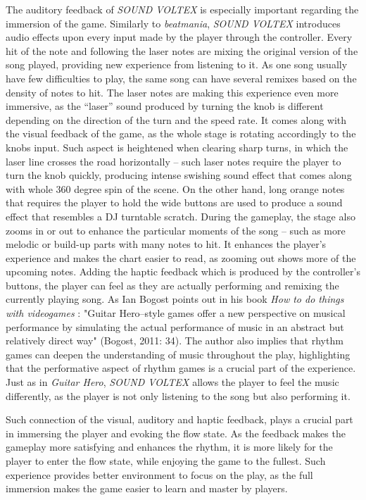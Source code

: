 The auditory feedback of \textit{SOUND VOLTEX} is especially important regarding the immersion of the game. Similarly to \textit{beatmania}, \textit{SOUND VOLTEX} introduces audio effects upon every input made by the player through the controller. Every hit of the note and following the laser notes are mixing the original version of the song played, providing new experience from listening to it. As one song usually have few difficulties to play, the same song can have several remixes based on the density of notes to hit. The laser notes are making this experience even more immersive, as the “laser” sound produced by turning the knob is different depending on the direction of the turn and the speed rate. It comes along with the visual feedback of the game, as the whole stage is rotating accordingly to the knobs input. Such aspect is heightened when clearing sharp turns, in which the laser line crosses the road horizontally -- such laser notes require the player to turn the knob quickly, producing intense swishing sound effect that comes along with whole 360 degree spin of the scene. On the other hand, long orange notes that requires the player to hold the wide buttons are used to produce a sound effect that resembles a DJ turntable scratch. During the gameplay, the stage also zooms in or out to enhance the particular moments of the song -- such as more melodic or build-up parts with many notes to hit. It enhances the player’s experience and makes the chart easier to read, as zooming out shows more of the upcoming notes. Adding the haptic feedback which is produced by the controller’s buttons, the player can feel as they are actually performing and remixing the currently playing song. As Ian Bogost points out in his book \textit{How to do things with videogames} \cite{bogostmusic}: "Guitar Hero–style games offer a new perspective on musical performance by simulating the actual performance of music in an abstract but relatively direct way" (Bogost, 2011: 34). The author also implies that rhythm games can deepen the understanding of music throughout the play, highlighting that the performative aspect of rhythm games is a crucial part of the experience. Just as in \textit{Guitar Hero}, \textit{SOUND VOLTEX} allows the player to feel the music differently, as the player is not only listening to the song but also performing it.

Such connection of the visual, auditory and haptic feedback, plays a crucial part in immersing the player and evoking the flow state. As the feedback makes the gameplay more satisfying and enhances the rhythm, it is more likely for the player to enter the flow state, while enjoying the game to the fullest. Such experience provides better environment to focus on the play, as the full immersion makes the game easier to learn and master by players.


